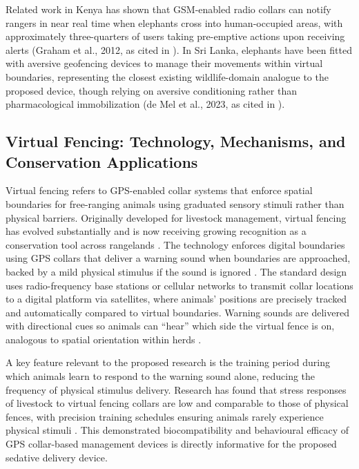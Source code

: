 \documentclass[12pt,a4paper]{article}
\begin{document}
    Related work in Kenya has shown that GSM-enabled radio collars can notify rangers in near
    real time when elephants cross into human-occupied areas, with approximately three-quarters
    of users taking pre-emptive actions upon receiving alerts (Graham et al., 2012, as cited in
    \cite{muliya2026}). In Sri Lanka, elephants have been fitted with aversive geofencing devices
    to manage their movements within virtual boundaries, representing the closest existing
    wildlife-domain analogue to the proposed device, though relying on aversive conditioning
    rather than pharmacological immobilization (de Mel et al., 2023, as cited in
    \cite{muliya2026}).

    \subsection{Virtual Fencing: Technology, Mechanisms, and Conservation Applications}

    Virtual fencing refers to GPS-enabled collar systems that enforce spatial boundaries for
    free-ranging animals using graduated sensory stimuli rather than physical barriers.
    Originally developed for livestock management, virtual fencing has evolved substantially
    and is now receiving growing recognition as a conservation tool across rangelands
    \cite{gilbert2026}. The technology enforces digital boundaries using GPS collars that
    deliver a warning sound when boundaries are approached, backed by a mild physical
    stimulus if the sound is ignored \cite{gilbert2026}. The standard design uses
    radio-frequency base stations or cellular networks to transmit collar locations to a digital
    platform via satellites, where animals' positions are precisely tracked and automatically
    compared to virtual boundaries. Warning sounds are delivered with directional cues so
    animals can ``hear'' which side the virtual fence is on, analogous to spatial orientation
    within herds \cite{gilbert2026}.

    A key feature relevant to the proposed research is the training period during which animals
    learn to respond to the warning sound alone, reducing the frequency of physical stimulus
    delivery. Research has found that stress responses of livestock to virtual fencing collars
    are low and comparable to those of physical fences, with precision training schedules
    ensuring animals rarely experience physical stimuli \cite{gilbert2026}. This demonstrated
    biocompatibility and behavioural efficacy of GPS collar-based management devices is
    directly informative for the proposed sedative delivery device.
\end{document}
